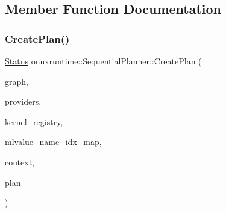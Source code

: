 \subsection{Member Function Documentation}
\mbox{\label{classonnxruntime_1_1SequentialPlanner_af214525da7457a82af57059cde27ef88}} 
\subsubsection{\texorpdfstring{Create\+Plan()}{CreatePlan()}\hspace{0.1cm}{\footnotesize\ttfamily [1/2]}}
{\footnotesize\ttfamily \mbox{\hyperlink{classonnxruntime_1_1common_1_1Status}{Status}} onnxruntime\+::\+Sequential\+Planner\+::\+Create\+Plan (\begin{DoxyParamCaption}\item[{const \mbox{\hyperlink{classonnxruntime_1_1GraphViewer}{onnxruntime\+::\+Graph\+Viewer}} \&}]{graph,  }\item[{const \mbox{\hyperlink{classonnxruntime_1_1ExecutionProviders}{Execution\+Providers}} \&}]{providers,  }\item[{const \mbox{\hyperlink{classonnxruntime_1_1KernelRegistryManager}{Kernel\+Registry\+Manager}} \&}]{kernel\+\_\+registry,  }\item[{const \mbox{\hyperlink{classonnxruntime_1_1MLValueNameIdxMap}{M\+L\+Value\+Name\+Idx\+Map}} \&}]{mlvalue\+\_\+name\+\_\+idx\+\_\+map,  }\item[{const \mbox{\hyperlink{classonnxruntime_1_1ISequentialPlannerContext}{I\+Sequential\+Planner\+Context}} \&}]{context,  }\item[{std\+::unique\+\_\+ptr$<$ \mbox{\hyperlink{structonnxruntime_1_1SequentialExecutionPlan}{Sequential\+Execution\+Plan}} $>$ \&}]{plan }\end{DoxyParamCaption})\hspace{0.3cm}{\ttfamily [static]}}

\mbox{\label{classonnxruntime_1_1SequentialPlanner_a255b7c44475f0c2f95c6087d3d20027a}} 
